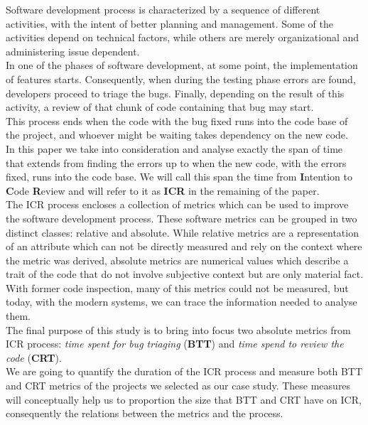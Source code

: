 \documentclass[10pt, conference]{IEEEtran}
\begin{document}
Software development process is characterized by a sequence 
of different activities, with the intent of better planning and management. 
Some of the activities depend on technical factors, while others are merely organizational 
and administering issue dependent.
\\
In one of the phases of software development, at some point, the implementation of features starts. 
Consequently, when during the testing phase errors are found, 
developers proceed to triage the bugs. Finally, depending on the result of this activity,
a review of that chunk of code containing that bug may start. 
\\
This process ends when the code with the bug fixed runs into the code base of the project, and whoever might be 
waiting takes dependency on the new code.
\\
In this paper we take into consideration and analyse exactly the span of time that extends 
from finding the errors up to when the 
new code, with the errors fixed, runs into the code base. We will call this span the time from \textbf{I}ntention to 
\textbf{C}ode \textbf{R}eview and will refer to it as \textbf{ICR} in the remaining of the paper.    
\\
The ICR process encloses a collection of metrics 
which can be used to improve the software development process.
These software metrics can be grouped in two distinct classes: relative and absolute.
While relative metrics are a representation of an attribute which can not be directly 
measured and rely on the context where the metric was derived, 
absolute metrics are numerical values which describe a trait of the code that do not 
involve subjective context but are only material fact.
\\
With former code inspection, many of this metrics could not be measured, but today, with the 
modern systems, we can trace the information needed to analyse them. 
\\ 
The final purpose of this study is to bring into focus two absolute metrics from ICR process: 
\emph{time spent for bug triaging} (\textbf{BTT})  and \emph{time spend to review the code} (\textbf{CRT}).
\\
We are going to quantify the duration of the ICR process and measure both BTT and CRT 
metrics of the projects we selected as our case study. These measures will 
conceptually help us to proportion the size that BTT and CRT have on ICR, 
consequently the relations between the metrics and the process.
\\
\end{document}
